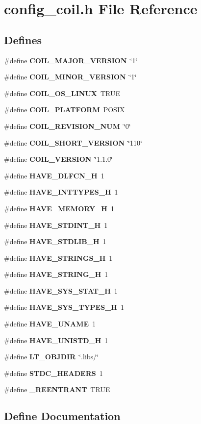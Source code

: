 \section{config\_\-coil.h File Reference}
\label{config__coil_8h}
\subsection*{Defines}
\begin{DoxyCompactItemize}
\item 
\#define {\bf COIL\_\-MAJOR\_\-VERSION}~\char`\"{}1\char`\"{}
\item 
\#define {\bf COIL\_\-MINOR\_\-VERSION}~\char`\"{}1\char`\"{}
\item 
\#define {\bf COIL\_\-OS\_\-LINUX}~TRUE
\item 
\#define {\bf COIL\_\-PLATFORM}~POSIX
\item 
\#define {\bf COIL\_\-REVISION\_\-NUM}~\char`\"{}0\char`\"{}
\item 
\#define {\bf COIL\_\-SHORT\_\-VERSION}~\char`\"{}110\char`\"{}
\item 
\#define {\bf COIL\_\-VERSION}~\char`\"{}1.1.0\char`\"{}
\item 
\#define {\bf HAVE\_\-DLFCN\_\-H}~1
\item 
\#define {\bf HAVE\_\-INTTYPES\_\-H}~1
\item 
\#define {\bf HAVE\_\-MEMORY\_\-H}~1
\item 
\#define {\bf HAVE\_\-STDINT\_\-H}~1
\item 
\#define {\bf HAVE\_\-STDLIB\_\-H}~1
\item 
\#define {\bf HAVE\_\-STRINGS\_\-H}~1
\item 
\#define {\bf HAVE\_\-STRING\_\-H}~1
\item 
\#define {\bf HAVE\_\-SYS\_\-STAT\_\-H}~1
\item 
\#define {\bf HAVE\_\-SYS\_\-TYPES\_\-H}~1
\item 
\#define {\bf HAVE\_\-UNAME}~1
\item 
\#define {\bf HAVE\_\-UNISTD\_\-H}~1
\item 
\#define {\bf LT\_\-OBJDIR}~\char`\"{}.libs/\char`\"{}
\item 
\#define {\bf STDC\_\-HEADERS}~1
\item 
\#define {\bf \_\-REENTRANT}~TRUE
\end{DoxyCompactItemize}


\subsection{Define Documentation}
